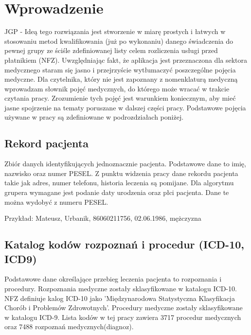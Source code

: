 \chapter{Wprowadzenie}
\label{cha:wprowadzenie}

JGP - Ideą tego rozwiązania jest stworzenie w miarę prostych i łatwych w stosowaniu metod kwalifikowania (już po wykonaniu) danego świadczenia do pewnej grupy ze ściśle zdefiniowanej listy celem rozliczenia usługi przed płatnikiem (NFZ).
Uwzględniając fakt, że aplikacja jest przeznaczona dla sektora medycznego staram się jasno i przejrzyście wytłumaczyć poszczególne pojęcia medyczne. Dla czytelnika, który nie jest zapoznany z nomenklaturą medyczną wprowadzam słownik pojęć medycznych, do którego może wracać w trakcie czytania pracy.
Zrozumienie tych pojęć jest warunkiem koniecznym, aby mieć jasne spojrzenie na tematy poruszane w dalszej części pracy. Podstawowe pojęcia używane w pracy są zdefiniowane w podrozdziałach poniżej.  


\section{Rekord pacjenta}
\label{sec:rekordPacjenta}

Zbiór danych identyfikujących jednoznacznie pacjenta. Podstawowe dane to imię, nazwisko oraz numer PESEL. Z punktu widzenia pracy dane rekordu pacjenta takie jak adres, numer telefonu, historia leczenia są pomijane. Dla algorytmu grupera wymagane jest podanie daty urodzenia oraz płci pacjenta. Dane te można wydobyć z numeru PESEL.

Przykład:
Mateusz, Urbanik, 86060211756, 02.06.1986, mężczyzna


\section{Katalog kodów rozpoznań i procedur (ICD-10, ICD9)}
\label{sec:kodyICD}

Podstawowe dane określające przebieg leczenia pacjenta to rozpoznania i procedury. Rozpoznania medyczne zostały sklasyfikowane w katalogu ICD-10. NFZ definiuje kalog ICD-10 jako 'Międzynarodowa Statystyczna Klasyfikacja Chorób i Problemów Zdrowotnych'.
Procedury medyczne zostały sklasyfikowane w katalogu ICD-9. Lista kodów w tej pracy zawiera 3717 procedur medycznych oraz 7488 rozpoznań medycznych(diagnoz).

